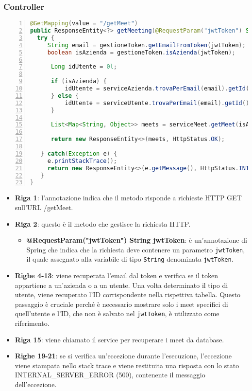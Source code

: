 \subsubsection{Controller}
\begin{lstlisting}[language=java, frame=lines, basicstyle=\ttfamily\scriptsize, numbers=left]
@GetMapping(value = "/getMeet")
public ResponseEntity<?> getMeeting(@RequestParam("jwtToken") String jwtToken) {
  try {
     String email = gestioneToken.getEmailFromToken(jwtToken);
     boolean isAzienda = gestioneToken.isAzienda(jwtToken);

	  Long idUtente = 0l;

	  if (isAzienda) {
		  idUtente = serviceAzienda.trovaPerEmail(email).getId();
	  } else {
		  idUtente = serviceUtente.trovaPerEmail(email).getId();
	  }

	  List<Map<String, Object>> meets = serviceMeet.getMeet(isAzienda, idUtente);

	  return new ResponseEntity<>(meets, HttpStatus.OK);

   } catch(Exception e) {
     e.printStackTrace();
     return new ResponseEntity<>(e.getMessage(), HttpStatus.INTERNAL_SERVER_ERROR);
   }
}    
\end{lstlisting}
\begin{itemize}
    \item \textbf{Riga 1}:
    l'annotazione indica che il metodo risponde a richieste HTTP GET sull'URL /getMeet.
  
    \item \textbf{Riga 2}:
    questo è il metodo che gestisce la richiesta HTTP. 
        \begin{itemize}         
            \item \textbf{@RequestParam("jwtToken") String jwtToken}: è un'annotazione di Spring che indica 
            che la richiesta deve contenere un parametro \texttt{jwtToken}, 
            il quale assegnato alla variabile di tipo \texttt{String} denominata \texttt{jwtToken}.      
        \end{itemize}
  
    \item \textbf{Righe 4-13}:
    viene recuperata l'email dal token e verifica se il token appartiene a un'azienda o a un utente. 
    Una volta determinato il tipo di utente, viene recuperato l'ID corrispondente nella rispettiva tabella. 
    Questo passaggio è cruciale perché è necessario mostrare solo i meet specifici di quell'utente e l'ID, 
    che non è salvato nel \texttt{jwtToken}, è utilizzato come riferimento.
  
    \item \textbf{Riga 15}:
    viene chiamato il service per recuperare i meet da database.
  
    \item \textbf{Righe 19-21}:
    se si verifica un'eccezione durante l'esecuzione, l'eccezione viene stampata nello stack trace e viene 
    restituita una risposta con lo stato INTERNAL_SERVER_ERROR (500), contenente il messaggio dell'eccezione.
  \end{itemize}